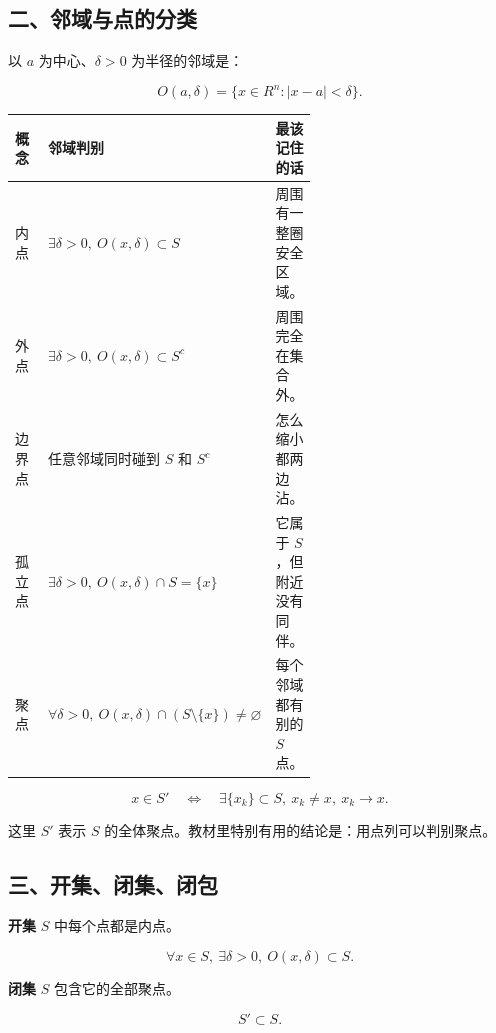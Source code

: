 \subsection*{二、邻域与点的分类}

以 \(a\) 为中心、\(\delta>0\) 为半径的邻域是：

\[
      O(a,\delta)=\{x\in R^n: |x-a|<\delta\}.
    \]

\begin{center}
\small
\begin{tabularx}{\linewidth}{|>{\raggedright\arraybackslash}p{0.18\linewidth}|>{\raggedright\arraybackslash}p{0.42\linewidth}|>{\raggedright\arraybackslash}X|}
\hline
\textbf{概念} & \textbf{邻域判别} & \textbf{最该记住的话} \\ \hline
内点 & \(\exists\delta>0,\ O(x,\delta)\subset S\) & 周围有一整圈安全区域。 \\ \hline
外点 & \(\exists\delta>0,\ O(x,\delta)\subset S^c\) & 周围完全在集合外。 \\ \hline
边界点 & 任意邻域同时碰到 \(S\) 和 \(S^c\) & 怎么缩小都两边沾。 \\ \hline
孤立点 & \(\exists\delta>0,\ O(x,\delta)\cap S=\{x\}\) & 它属于 \(S\)，但附近没有同伴。 \\ \hline
聚点 & \(\forall\delta>0,\ O(x,\delta)\cap(S\setminus\{x\})\ne\varnothing\) & 每个邻域都有别的 \(S\) 点。 \\ \hline
\end{tabularx}
\end{center}

\[
      x\in S' \quad\Longleftrightarrow\quad
      \exists\{x_k\}\subset S,\ x_k\ne x,\ x_k\to x.
    \]

这里 \(S'\) 表示 \(S\) 的全体聚点。教材里特别有用的结论是：用点列可以判别聚点。

\subsection*{三、开集、闭集、闭包}

\begin{conceptbox}
\textbf{开集}
\(S\) 中每个点都是内点。

\[
          \forall x\in S,\ \exists\delta>0,\ O(x,\delta)\subset S.
        \]
\end{conceptbox}

\begin{conceptbox}
\textbf{闭集}
\(S\) 包含它的全部聚点。

\[
          S'\subset S.
        \]
\end{conceptbox}

